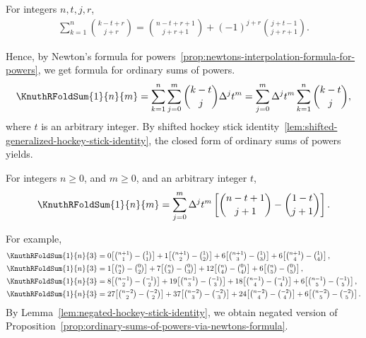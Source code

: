 \begin{lemma} 
  \label{lem:negated-hockey-stick-identity}
  For integers $n,t,j,r$,
  \begin{align*}
    \sum_{k=1}^{n} \binom{k-t+r}{j+r}
    = \binom{n-t+r+1}{j+r+1} + (-1)^{j+r} \binom{j+t-1}{j+r+1}.
  \end{align*}
\end{lemma}

Hence, by Newton's formula for
powers~\eqref{prop:newtons-interpolation-formula-for-powers},
we get formula for ordinary sums of powers.
\begin{align*}
  \KnuthRFoldSum{1}{n}{m}
  = \sum_{k=1}^{n} \sum_{j=0}^{m} \binom{k-t}{j} \Delta^{j} t^m
  = \sum_{j=0}^{m} \Delta^{j} t^m  \sum_{k=1}^{n} \binom{k-t}{j},
\end{align*}
where $t$ is an arbitrary integer.
By shifted hockey stick
identity~\eqref{lem:shifted-generalized-hockey-stick-identity},
the closed form of ordinary sums of powers yields.

\begin{proposition}
  \label{prop:ordinary-sums-of-powers-via-newtons-formula}
  For integers $n\geq 0$, and $m\geq 0$, and an arbitrary integer $t$,
  \begin{align*}
    \KnuthRFoldSum{1}{n}{m} = \sum_{j=0}^{m} \Delta^{j} t^m
    \left[ \binom{n-t+1}{j+1} - \binom{1-t}{j+1} \right].
  \end{align*}
\end{proposition}

For example,
\begin{align*}
  \KnuthRFoldSum{1}{n}{3}
  &= 0\!\left[\tbinom{n+1}{1}-\tbinom{1}{1}\right]
  + 1\!\left[\tbinom{n+1}{2}-\tbinom{1}{2}\right]
  + 6\!\left[\tbinom{n+1}{3}-\tbinom{1}{3}\right]
  + 6\!\left[\tbinom{n+1}{4}-\tbinom{1}{4}\right], \\
  \KnuthRFoldSum{1}{n}{3}
  &= 1\!\left[\tbinom{n}{2}-\tbinom{0}{2}\right]
  + 7\!\left[\tbinom{n}{3}-\tbinom{0}{3}\right]
  + 12\!\left[\tbinom{n}{4}-\tbinom{0}{4}\right]
  + 6\!\left[\tbinom{n}{5}-\tbinom{0}{5}\right], \\
  \KnuthRFoldSum{1}{n}{3}
  &= 8\!\left[\tbinom{n-1}{2}-\tbinom{-1}{2}\right]
  + 19\!\left[\tbinom{n-1}{3}-\tbinom{-1}{3}\right]
  + 18\!\left[\tbinom{n-1}{4}-\tbinom{-1}{4}\right]
  + 6\!\left[\tbinom{n-1}{5}-\tbinom{-1}{5}\right], \\
  \KnuthRFoldSum{1}{n}{3}
  &= 27\!\left[\tbinom{n-2}{2}-\tbinom{-2}{2}\right]
  + 37\!\left[\tbinom{n-2}{3}-\tbinom{-2}{3}\right]
  + 24\!\left[\tbinom{n-2}{4}-\tbinom{-2}{4}\right]
  + 6\!\left[\tbinom{n-2}{5}-\tbinom{-2}{5}\right].
\end{align*}
By Lemma~\eqref{lem:negated-hockey-stick-identity},
we obtain negated version of
Proposition~\eqref{prop:ordinary-sums-of-powers-via-newtons-formula}.

